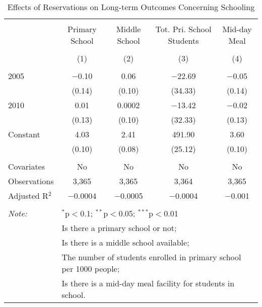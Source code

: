 
\begin{table}[!htbp] \centering 
  \caption{Effects of Reservations on Long-term Outcomes Concerning Schooling} 
  \label{raj_shrug_schooling_05_10} 
\scriptsize 
\begin{tabular}{@{\extracolsep{5pt}}lcccc} 
\\[-1.8ex]\hline 
\hline \\[-1.8ex] 
 & Primary School & Middle School & Tot. Pri. School Students & Mid-day Meal \\ 
\\[-1.8ex] & (1) & (2) & (3) & (4)\\ 
\hline \\[-1.8ex] 
 2005 & $-$0.10 & 0.06 & $-$22.69 & $-$0.05 \\ 
  & (0.14) & (0.10) & (34.33) & (0.14) \\ 
  2010 & 0.01 & 0.0002 & $-$13.42 & $-$0.02 \\ 
  & (0.13) & (0.10) & (32.33) & (0.13) \\ 
  Constant & 4.03 & 2.41 & 491.90 & 3.60 \\ 
  & (0.10) & (0.08) & (25.12) & (0.10) \\ 
 \hline \\[-1.8ex] 
Covariates & No & No & No & No \\ 
Observations & 3,365 & 3,365 & 3,364 & 3,365 \\ 
Adjusted R$^{2}$ & $-$0.0004 & $-$0.0005 & $-$0.0004 & $-$0.001 \\ 
\hline 
\hline \\[-1.8ex] 
\textit{Note:}  & \multicolumn{4}{l}{$^{*}$p$<$0.1; $^{**}$p$<$0.05; $^{***}$p$<$0.01} \\ 
 & \multicolumn{4}{l}{Is there a primary school or not;} \\ 
 & \multicolumn{4}{l}{Is there is a middle school available;} \\ 
 & \multicolumn{4}{l}{The number of students enrolled in primary school per 1000 people;} \\ 
 & \multicolumn{4}{l}{Is there is a mid-day meal facility for students in school.} \\ 
\end{tabular} 
\end{table} 
